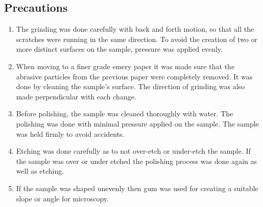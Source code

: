 \documentclass[12pt,a4paper]{article}
\begin{document}
\subsection{Precautions}
\begin{enumerate}
\item The grinding was done carefully with back and forth motion, so that all the scratches were running in the same direction. To avoid the creation of two or more distinct surfaces on the sample, pressure was applied evenly. 
\item When moving to a finer grade emery paper it was made sure that the abrasive particles from the previous paper were completely removed. It was done by cleaning the sample's surface. The direction of grinding was also made perpendicular with each change.  
\item Before polishing, the sample was cleaned thoroughly with water. The polishing was done with minimal pressure applied on the sample. The sample was held firmly to avoid accidents.
\item Etching was done carefully as to not over-etch or under-etch the sample. If the sample was over or under etched the polishing process was done again as well as etching.
\item If the sample was shaped unevenly then gum was used for creating a suitable slope or angle for microscopy.   
\end{enumerate}
%
\end{document}
